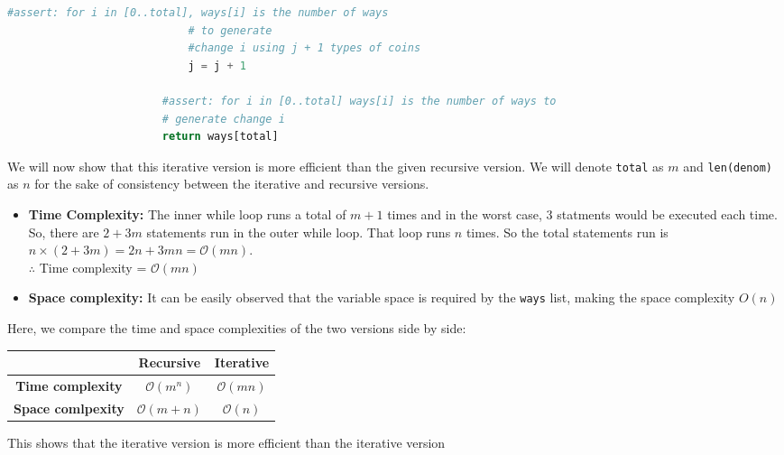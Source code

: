 \documentclass[answers]{exam}
\renewcommand{\O}[1]{\mathcal{O}\left(#1\right)}
\begin{document}
\begin{questions}
\begin{parts}
\begin{solution}
\begin{lstlisting}[language=Python]
                            #assert: for i in [0..total], ways[i] is the number of ways
                            # to generate
                            #change i using j + 1 types of coins
                            j = j + 1

                        #assert: for i in [0..total] ways[i] is the number of ways to 
                        # generate change i
                        return ways[total]
                \end{lstlisting}

                We will now show that this iterative version is more efficient than the
                given recursive version. We will denote \lstinline{total} as \(m\) and 
                \lstinline{len(denom)} as \(n\) for the sake of consistency between the
                iterative and recursive versions.
                \begin{itemize}
                    \item {
                        \textbf{Time Complexity: } The inner while loop runs a total of
                        \(m + 1\) times and in the worst case, 3 statments would be executed
                        each time.
                        So, there are \(2 + 3m\) statements run in the outer while loop. That
                        loop runs \(n\) times. So the total statements run is \(n \times (2 + 3m)
                        = 2n + 3mn = \O{mn}\).\\
                        \(\therefore\) Time complexity = \(\O{mn}\)
                    }
                    \item {
                        \textbf{Space complexity: } It can be easily observed that the variable
                        space is required by the \lstinline{ways} list, making the space 
                        complexity \(O(n)\)
                    }
                \end{itemize}

                Here, we compare the time and space complexities of the two versions side by side:
                \begin{center}
                \tabulinesep=1.2mm
                \begin{tabu}{ |c|c c| }
                    \hline
                     & \textbf{Recursive} & \textbf{Iterative} \\
                     \hline
                     \textbf{Time complexity} & \(\O{m^n}\) & \(\O{mn}\) \\
                     \textbf{Space comlpexity} & \(\O{m + n}\) & \(\O{n}\) \\
                     \hline
                \end{tabu}
                \end{center}

                This shows that the iterative version is more efficient than the iterative version
            \end{solution}
        \end{parts}
    \end{questions}
\end{document}
